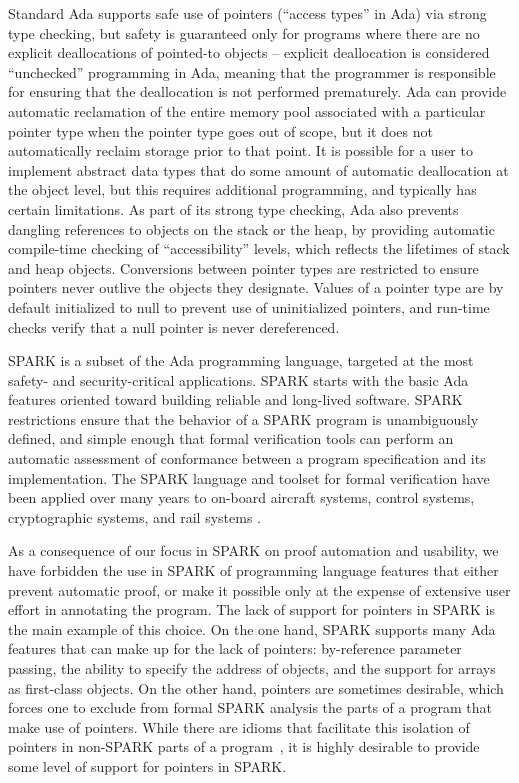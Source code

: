 \documentclass{llncs}
\begin{document}
Standard Ada supports safe use of pointers (``access types'' in Ada) via strong type checking, but safety is guaranteed only for programs where there are no explicit deallocations of pointed-to objects -- explicit deallocation is considered ``unchecked'' programming in Ada, meaning that the programmer is responsible for ensuring that the deallocation is not performed prematurely. Ada can provide automatic reclamation of the entire memory pool associated with a particular pointer type when the pointer type goes out of scope, but it does not automatically reclaim storage prior to that point. It is possible for a user to implement abstract data types that do some amount of automatic deallocation at the object level, but this requires additional programming, and typically has certain limitations. As part of its strong type checking, Ada also prevents dangling references to objects on the stack or the heap, by providing automatic compile-time checking of ``accessibility'' levels, which reflects the lifetimes of stack and heap objects.  Conversions between pointer types are restricted to ensure pointers never outlive the objects they designate. Values of a pointer type are by default initialized to null to prevent use of uninitialized pointers, and run-time checks verify that a null pointer is never dereferenced.

\smallskip
SPARK is a subset of the Ada programming language, targeted at the most safety- and security-critical applications. SPARK starts with the basic Ada features oriented toward building reliable and long-lived software. SPARK restrictions ensure that the behavior of a SPARK program is unambiguously defined, and simple enough that formal verification tools can perform an automatic assessment of conformance between a program specification and its implementation. The SPARK language and toolset for formal verification have been applied over many years to on-board aircraft systems,
control systems, cryptographic systems, and rail systems \cite{ONeill2012, McCormick2015}.

\smallskip
As a consequence of our focus in SPARK on proof automation and usability, we have forbidden the use in SPARK of programming language features that either prevent automatic proof, or make it possible only at the expense of extensive user effort in annotating the program. The lack of support for pointers in SPARK is the main example of this choice. On the one hand, SPARK supports many Ada features that can make up for the lack of pointers: by-reference parameter passing, the ability to specify the address of objects, and the support for arrays as first-class objects. On the other hand, pointers are sometimes desirable, which forces one to exclude from formal SPARK analysis the parts of a program that make use of pointers. While there are idioms that facilitate this isolation of pointers in non-SPARK parts of a program~\cite{AdaCoreThalesSPARK}, it is highly desirable to provide some level of support for pointers in SPARK.
\end{document}
